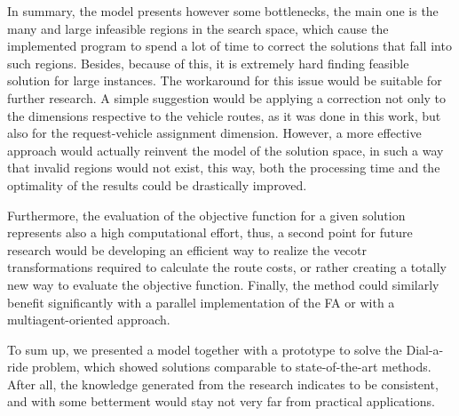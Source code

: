 \documentclass[tuberlin,cic,tc,openright,english,noabntcite,oneside]{iiufrgs}
\begin{document}
In summary, the model presents however some bottlenecks, the main one is the many and large infeasible regions in the search space, which cause the implemented program to spend a lot of time to correct the solutions that fall into such regions. Besides, because of this, it is extremely hard finding feasible solution for large instances. The workaround for this issue would be suitable for further research. A simple suggestion would be applying a correction not only to the dimensions respective to the vehicle routes, as it was done in this work, but also for the request-vehicle assignment dimension. However, a more effective approach would actually reinvent the model of the solution space, in such a way that invalid regions would not exist, this way, both the processing time and the optimality of the results could be drastically improved.

Furthermore, the evaluation of the objective function for a given solution represents also a high computational effort, thus, a second point for future research would be developing an efficient way to realize the vecotr transformations required to calculate the route costs, or rather creating a totally new way to evaluate the objective function. Finally, the method could similarly benefit significantly with a parallel implementation of the FA or with a multiagent-oriented approach.

To sum up, we presented a model together with a prototype to solve the Dial-a-ride problem, which showed solutions comparable to state-of-the-art methods. After all, the knowledge generated from the research indicates to be consistent, and with some betterment would stay not very far from practical applications.
\nocite{*}
%
\printbibliography
\end{document}
